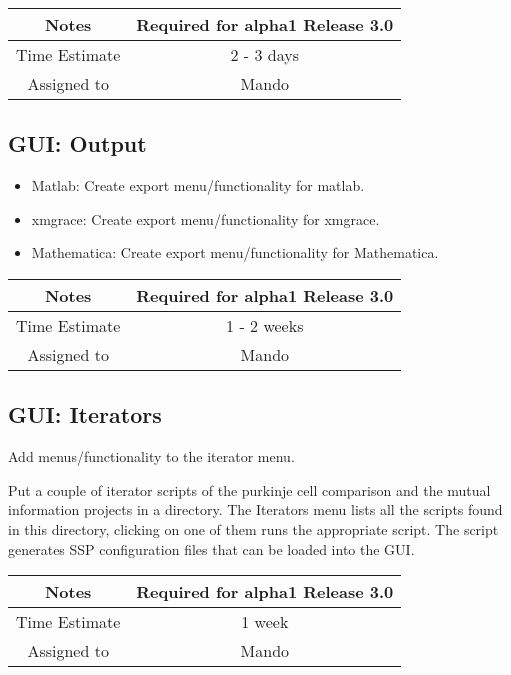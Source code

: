 \documentclass[12pt]{article}
\begin{document}
{
  \vspace{5mm}
  \centering
  \begin{tabular}{|c|c|}
    \hline
    Notes
    & Required for alpha1 Release 3.0 \\
    \hline
    Time Estimate
    & 2 - 3 days \\
    \hline
    Assigned to
    & Mando \\
    \hline
  \end{tabular}
}


\subsection{GUI: Output}
\begin{itemize}
\item Matlab: Create export menu/functionality for matlab.
\item xmgrace: Create export menu/functionality for xmgrace.
\item Mathematica: Create export menu/functionality for Mathematica.
\end{itemize}

{
  \vspace{5mm}
  \centering
  \begin{tabular}{|c|c|}
    \hline
    Notes
    & Required for alpha1 Release 3.0 \\
    \hline
    Time Estimate
    & 1 - 2 weeks \\
    \hline
    Assigned to
    & Mando \\
    \hline
  \end{tabular}
}


\subsection{GUI: Iterators}
Add menus/functionality to the iterator menu.

Put a couple of iterator scripts of the purkinje cell comparison and
the mutual information projects in a directory.  The Iterators menu
lists all the scripts found in this directory, clicking on one of them
runs the appropriate script.  The script generates SSP configuration
files that can be loaded into the GUI.

{
  \vspace{5mm}
  \centering
  \begin{tabular}{|c|c|}
    \hline
    Notes
    & Required for alpha1 Release 3.0 \\
    \hline
    Time Estimate
    & 1 week \\
    \hline
    Assigned to
    & Mando \\
    \hline
  \end{tabular}
}
\end{document}
